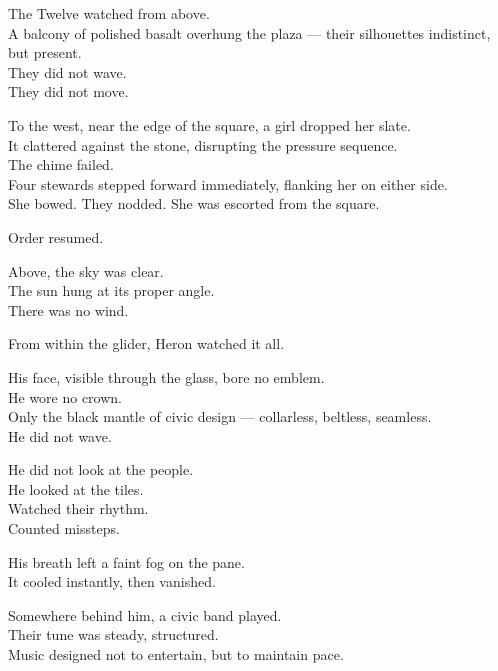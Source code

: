 \documentclass[12pt]{article}
\begin{document}
\vspace{1em}

The Twelve watched from above.\\
A balcony of polished basalt overhung the plaza — their silhouettes indistinct, but present.\\
They did not wave.\\
They did not move.

\vspace{1em}

To the west, near the edge of the square, a girl dropped her slate.\\
It clattered against the stone, disrupting the pressure sequence.\\
The chime failed.\\
Four stewards stepped forward immediately, flanking her on either side.\\
She bowed. They nodded. She was escorted from the square.

Order resumed.

\vspace{1em}

Above, the sky was clear.\\
The sun hung at its proper angle.\\
There was no wind.

\vspace{1em}

From within the glider, Heron watched it all.

His face, visible through the glass, bore no emblem.\\
He wore no crown.\\
Only the black mantle of civic design — collarless, beltless, seamless.\\
He did not wave.

He did not look at the people.\\
He looked at the tiles.\\
Watched their rhythm.\\
Counted missteps.

His breath left a faint fog on the pane.\\
It cooled instantly, then vanished.

\vspace{1em}

Somewhere behind him, a civic band played.\\
Their tune was steady, structured.\\
Music designed not to entertain, but to maintain pace.
\end{document}
